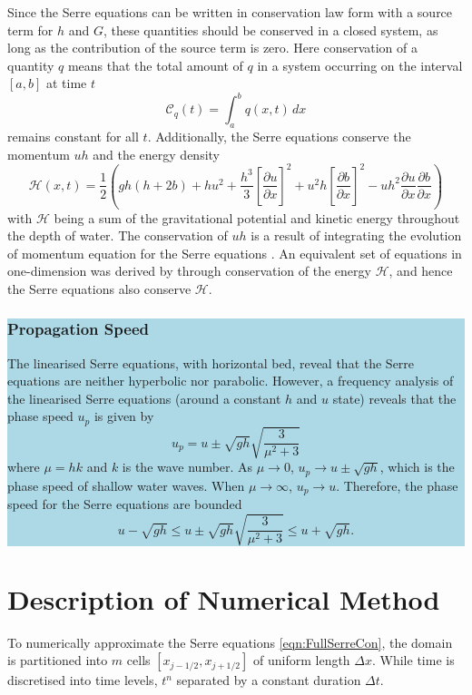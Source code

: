 \documentclass[times]{elsarticle}
\newcommand{\hlb}[1] {\par\colorbox{lightblue}{\parbox{\linewidth}{#1}}}
\newcommand{\hlb}[1] {{#1}}
\begin{document}
Since the Serre equations can be written in conservation law form with a source term for $h$ and $G$, these quantities should be conserved in a closed system, as long as the contribution of the source term is zero. Here conservation of a quantity $q$ means that the total amount of $q$ in a system occurring on the interval $[a,b]$ at time $t$
\begin{equation*}
\mathcal{C}_q(t) = \int_{a}^{b} q(x,t)\, dx
\end{equation*}
remains constant for all $t$. Additionally, the Serre equations conserve the momentum $uh$ and the energy density
\begin{equation*}
\mathcal{H}(x,t) = \frac{1}{2} \left( gh\left(h + 2b\right) + hu^2  + \frac{h^3}{3} \left[\frac{\partial u}{\partial x}\right]^2 + u^2h\left[\frac{\partial b}{\partial x}\right]^2 - uh^2 \frac{\partial u}{\partial x} \frac{\partial b}{\partial x}  \right)
\label{eqn:Hamildef}
\end{equation*}
with $\mathcal{H}$ being a sum of the gravitational potential and kinetic energy throughout the depth of water.
The conservation of $uh$ is a result of integrating the evolution of momentum equation for the Serre equations \cite{Zoppou-etal-2017}. An equivalent set of equations in one-dimension was derived by \citet{Green-Naghdi-1976-237} through conservation of the energy $\mathcal{H}$,  and hence the Serre equations also conserve $\mathcal{H}$.

\hlb{
\subsubsection{Propagation Speed}
The linearised Serre equations, with horizontal bed, reveal that the Serre equations are neither hyperbolic nor parabolic. However, a frequency analysis of the linearised Serre equations (around a constant $h$ and $u$ state) reveals that the phase speed $u_p$ is given by \cite{Zoppou-etal-2017}
\[
u_p = u \pm \sqrt{gh} \sqrt{\dfrac{3}{\mu^2 + 3}}
\]
where $\mu = h k$ and $k$ is the wave number. As $\mu \rightarrow 0$, $u_p \rightarrow u \pm \sqrt{gh}$, which is the phase speed of shallow water waves. When $\mu \rightarrow \infty$, $u_p \rightarrow u$. Therefore, the phase speed for the Serre equations are bounded
\[
u - \sqrt{gh} \le u \pm \sqrt{gh} \sqrt{\dfrac{3}{\mu^2 + 3}} \le u + \sqrt{gh}.
\]
}
\section{Description of Numerical Method}
To numerically approximate the Serre equations \eqref{eqn:FullSerreCon}, the domain is partitioned into $m$ cells $\left[x_{j-1/2},x_{j+1/2}\right]$ of uniform length $\Delta x$. While time is discretised into time levels, $t^n$ separated by a constant duration $\Delta t$.
\end{document}
